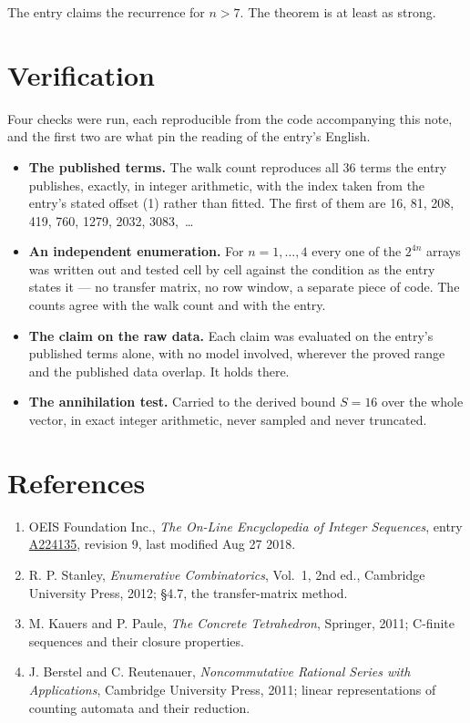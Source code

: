 \documentclass[11pt]{article}
\theoremstyle{definition}
\begin{document}
The entry claims the recurrence for $n > 7$. The theorem is at least as strong.

\section{Verification}

Four checks were run, each reproducible from the code accompanying this note, and the first two are what pin the reading of the entry's English.

\begin{itemize}

\item {\bfseries The published terms.} The walk count reproduces all 36 terms the entry publishes, exactly, in integer arithmetic, with the index taken from the entry's stated offset (1) rather than fitted. The first of them are 16, 81, 208, 419, 760, 1279, 2032, 3083,~\dots

\item {\bfseries An independent enumeration.} For $n = 1,\dots,4$ every one of the $2^{4n}$ arrays was written out and tested cell by cell against the condition as the entry states it --- no transfer matrix, no row window, a separate piece of code. The counts agree with the walk count and with the entry.

\item {\bfseries The claim on the raw data.} Each claim was evaluated on the entry's published terms alone, with no model involved, wherever the proved range and the published data overlap. It holds there.

\item {\bfseries The annihilation test.} Carried to the derived bound $S = 16$ over the whole vector, in exact integer arithmetic, never sampled and never truncated.

\end{itemize}

\section{References}

\begin{enumerate}

\item OEIS Foundation Inc., \emph{The On-Line Encyclopedia of Integer Sequences}, entry \href{https://oeis.org/A224135}{A224135}, revision 9, last modified Aug 27 2018.

\item R. P. Stanley, \emph{Enumerative Combinatorics}, Vol.~1, 2nd ed., Cambridge University Press, 2012; \S4.7, the transfer-matrix method.

\item M. Kauers and P. Paule, \emph{The Concrete Tetrahedron}, Springer, 2011; C-finite sequences and their closure properties.

\item J. Berstel and C. Reutenauer, \emph{Noncommutative Rational Series with Applications}, Cambridge University Press, 2011; linear representations of counting automata and their reduction.

\end{enumerate}
\end{document}
